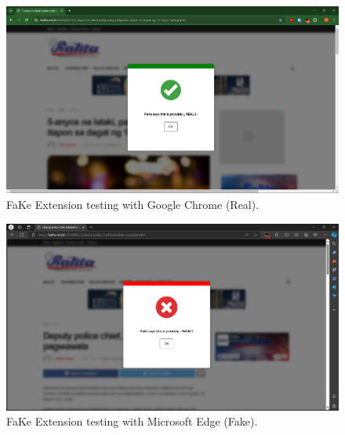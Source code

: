         \begin{figure}[h!]
            \centering
            \includegraphics[width=1\textwidth,height=1\textheight, keepaspectratio]{figures/Screenshots/chrome-real.png}
                \caption{FaKe Extension testing with Google Chrome (Real).}
                \label{fig:real-chrome-test}
            \end{figure}

            \begin{figure}[h!]
                \centering
                \includegraphics[width=1\textwidth,height=1\textheight, keepaspectratio]{figures/Screenshots/edge-fake.png}
                    \caption{FaKe Extension testing with Microsoft Edge (Fake).}
                    \label{fig:fake-edge-test}
                \end{figure}

